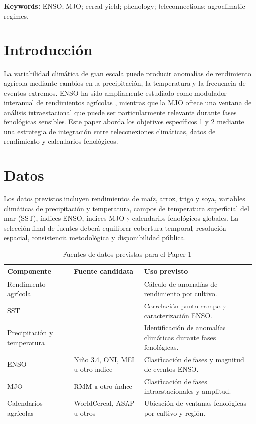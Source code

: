 
\textbf{Keywords:} ENSO; MJO; cereal yield; phenology; teleconnections; agroclimatic regimes.

\section{Introducción}

La variabilidad climática de gran escala puede producir anomalías de rendimiento agrícola mediante cambios en la precipitación, la temperatura y la frecuencia de eventos extremos. ENSO ha sido ampliamente estudiado como modulador interanual de rendimientos agrícolas \parencite{iizumi2014enso,anderson2019synchronous}, mientras que la MJO ofrece una ventana de análisis intraestacional que puede ser particularmente relevante durante fases fenológicas sensibles. Este paper aborda los objetivos específicos 1 y 2 mediante una estrategia de integración entre teleconexiones climáticas, datos de rendimiento y calendarios fenológicos.


\section{Datos}

Los datos previstos incluyen rendimientos de maíz, arroz, trigo y soya, variables climáticas de precipitación y temperatura, campos de temperatura superficial del mar (SST), índices ENSO, índices MJO y calendarios fenológicos globales. La selección final de fuentes deberá equilibrar cobertura temporal, resolución espacial, consistencia metodológica y disponibilidad pública.


\begin{table}[H]
\centering
\caption{Fuentes de datos previstas para el Paper 1.}
\label{tab:paper1_datos}
\begin{tabular}{p{3.2cm}p{4.2cm}p{5.2cm}}
\toprule
Componente & Fuente candidata & Uso previsto \\
\midrule
Rendimiento agrícola & %
& Cálculo de anomalías de rendimiento por cultivo. \\
SST & %
& Correlación punto-campo y caracterización ENSO. \\
Precipitación y temperatura & %
& Identificación de anomalías climáticas durante fases fenológicas. \\
ENSO & Niño 3.4, ONI, MEI u otro índice & Clasificación de fases y magnitud de eventos ENSO. \\
MJO & RMM u otro índice & Clasificación de fases intraestacionales y amplitud. \\
Calendarios agrícolas & WorldCereal, ASAP u otros & Ubicación de ventanas fenológicas por cultivo y región. \\
\bottomrule
\end{tabular}
\end{table}

